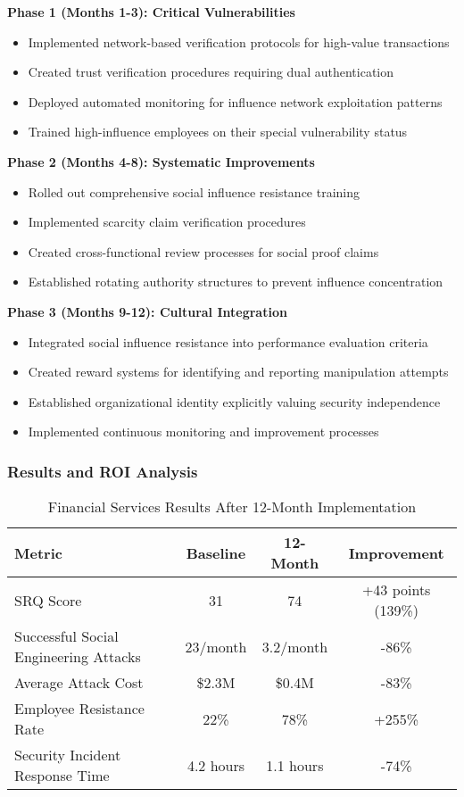 \documentclass[11pt,a4paper]{article}
\begin{document}
\textbf{Phase 1 (Months 1-3): Critical Vulnerabilities}
\begin{itemize}
\item Implemented network-based verification protocols for high-value transactions
\item Created trust verification procedures requiring dual authentication
\item Deployed automated monitoring for influence network exploitation patterns
\item Trained high-influence employees on their special vulnerability status
\end{itemize}

\textbf{Phase 2 (Months 4-8): Systematic Improvements}
\begin{itemize}
\item Rolled out comprehensive social influence resistance training
\item Implemented scarcity claim verification procedures
\item Created cross-functional review processes for social proof claims
\item Established rotating authority structures to prevent influence concentration
\end{itemize}

\textbf{Phase 3 (Months 9-12): Cultural Integration}
\begin{itemize}
\item Integrated social influence resistance into performance evaluation criteria
\item Created reward systems for identifying and reporting manipulation attempts
\item Established organizational identity explicitly valuing security independence
\item Implemented continuous monitoring and improvement processes
\end{itemize}

\subsubsection{Results and ROI Analysis}

\begin{table}[H]
\centering
\caption{Financial Services Results After 12-Month Implementation}
\begin{tabular}{lccc}
\toprule
Metric & Baseline & 12-Month & Improvement \\
\midrule
SRQ Score & 31 & 74 & +43 points (139\%) \\
Successful Social Engineering Attacks & 23/month & 3.2/month & -86\% \\
Average Attack Cost & \$2.3M & \$0.4M & -83\% \\
Employee Resistance Rate & 22\% & 78\% & +255\% \\
Security Incident Response Time & 4.2 hours & 1.1 hours & -74\% \\
\bottomrule
\end{tabular}
\end{table}
\end{document}
